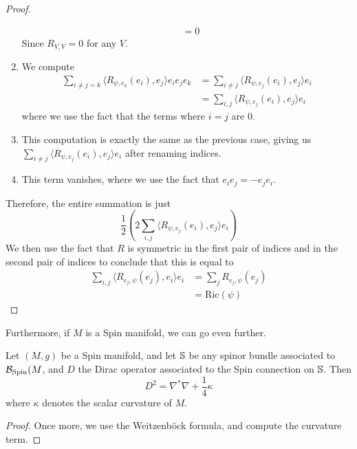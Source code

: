 \begin{proof}
\begin{enumerate}
\begin{align*}
  &= 0
  \end{align*}
  Since $R_{V,V} = 0$ for any $V$.
  \item We compute
  \begin{align*}
  \sum_{i \neq j = k}\langle R_{\psi,e_k}(e_i), e_j\rangle e_ie_je_k
  &= \sum_{i \neq j} \langle R_{\psi, e_j}(e_i), e_j\rangle e_i \\
  &= \sum_{i,j} \langle R_{\psi, e_j}(e_i), e_j \rangle e_i
  \end{align*}
  where we use the fact that the terms where $i = j$ are $0$.
  \item This computation is exactly the same as the previous case, giving us
  $\sum_{i \neq j} \langle R_{\psi, e_j}(e_i), e_j \rangle e_i$ after renaming indices.
  \item This term vanishes, where we use the fact that $e_ie_j = -e_je_i$.
\end{enumerate}
Therefore, the entire summation is just
\[
\frac{1}{2} \left( 2\sum_{i, j}\langle R_{\psi, e_j}(e_i), e_j \rangle e_i \right)
\]
We then use the fact that $R$ is symmetric in the first pair of indices and in
the second pair of indices to conclude that this is equal to
\begin{align*}
\sum_{i,j}\langle R_{e_j,\psi}(e_j), e_i \rangle e_i &= \sum_j R_{e_j, \psi}(e_j) \\
&= \mathrm{Ric}(\psi)
\end{align*}
\end{proof}
Furthermore, if $M$ is a Spin manifold, we can go even further.
%
\begin{thm}[\ib{Lichnerowicz}]
Let $(M,g)$ be a Spin manifold, and let $\S$ be any spinor bundle associated to
$\B_{\Spin}(M$, and $D$ the Dirac operator associated to the Spin connection on $\S$.
Then
\[
D^2 = \nabla^*\nabla + \frac{1}{4}\kappa
\]
where $\kappa$ denotes the scalar curvature of $M$.
\end{thm}
%
\begin{proof} %
Once more, we use the Weitzenb\"ock formula, and compute the curvature term.
\end{proof}
%
